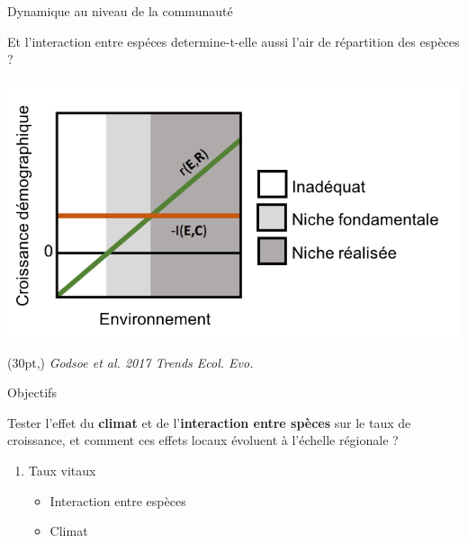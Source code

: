 \documentclass[11pt, compress, aspectratio=1610]{beamer}
\newcommand\smallcitation[1]{%
\begin{textblock*}{\textwidth}(30pt,\textheight)
	\raggedleft \footnotesize\textit{#1}
\end{textblock*}}
\providecommand{\tightlist}{%
  \setlength{\itemsep}{0pt}\setlength{\parskip}{0pt}}
\begin{document}
\begin{frame}{Dynamique au niveau de la communauté}
\protect\hypertarget{dynamique-au-niveau-de-la-communautuxe9}{}

Et l’interaction entre espéces determine-t-elle aussi l’air de
répartition des espèces ?

\centering

\includegraphics[scale=0.685]{figures/Godsoe2017b.png}

\par

\smallcitation{Godsoe et al. 2017 Trends Ecol. Evo.}

\end{frame}

\begin{frame}{Objectifs}
\protect\hypertarget{objectifs-2}{}

\centering

Tester l’effet du \textbf{climat} et de l’\textbf{interaction entre
spèces} sur le taux de croissance, et comment ces effets locaux évoluent
à l’échelle régionale ?

\begin{enumerate}
[1.]
\tightlist
\item
  Taux vitaux

  \begin{itemize}
  \tightlist
  \item
    Interaction entre espèces
  \item
    Climat
  \end{itemize}
\end{enumerate}

\end{frame}
\end{document}
